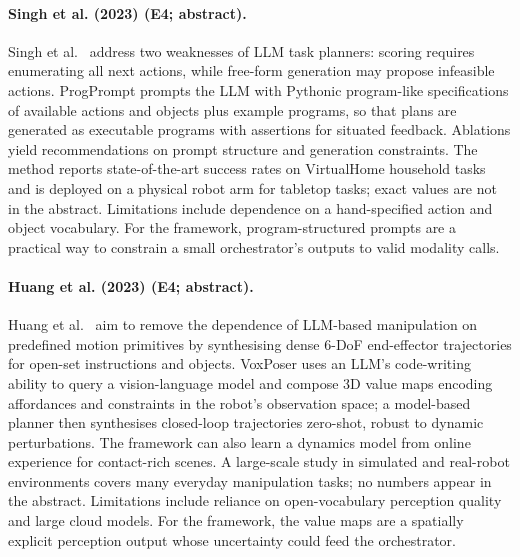 \documentclass[10pt,a4paper]{article}
\begin{document}
\paragraph{Singh et al. (2023) (E4; abstract).} Singh et al.~\cite{Singh2023} address two weaknesses of LLM task planners: scoring requires enumerating all next actions, while free-form generation may propose infeasible actions. ProgPrompt prompts the LLM with Pythonic program-like specifications of available actions and objects plus example programs, so that plans are generated as executable programs with assertions for situated feedback. Ablations yield recommendations on prompt structure and generation constraints. The method reports state-of-the-art success rates on VirtualHome household tasks and is deployed on a physical robot arm for tabletop tasks; exact values are not in the abstract. Limitations include dependence on a hand-specified action and object vocabulary. For the framework, program-structured prompts are a practical way to constrain a small orchestrator's outputs to valid modality calls.

\paragraph{Huang et al. (2023) (E4; abstract).} Huang et al.~\cite{Huang2023a} aim to remove the dependence of LLM-based manipulation on predefined motion primitives by synthesising dense 6-DoF end-effector trajectories for open-set instructions and objects. VoxPoser uses an LLM's code-writing ability to query a vision-language model and compose 3D value maps encoding affordances and constraints in the robot's observation space; a model-based planner then synthesises closed-loop trajectories zero-shot, robust to dynamic perturbations. The framework can also learn a dynamics model from online experience for contact-rich scenes. A large-scale study in simulated and real-robot environments covers many everyday manipulation tasks; no numbers appear in the abstract. Limitations include reliance on open-vocabulary perception quality and large cloud models. For the framework, the value maps are a spatially explicit perception output whose uncertainty could feed the orchestrator.
\end{document}
